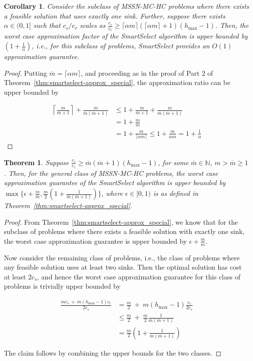\documentclass[conference]{IEEEtran}
\newcommand{\mbar}{\overline{m}}
\newtheorem{theorem}{Theorem}
\newtheorem{corollary}{Corollary}
\begin{document}
\begin{corollary}
Consider the subclass of MSSN-MC-HC problems where there exists a feasible solution that uses exactly one sink. Further, suppose there exists $\alpha\in (0,1]$ such that $c_s/c_r$ scales as $\frac{c_s}{c_r}\geq \lceil\alpha m\rceil (\lceil\alpha m\rceil + 1)(h_{\max}-1)$. Then, the worst case approximation factor of the SmartSelect algorithm is upper bounded by $(1+\frac{1}{\alpha})$, i.e., for this subclass of problems, SmartSelect provides an $O(1)$ approximation guarantee.
\end{corollary}

\begin{proof}
Putting $\mbar = \lceil\alpha m\rceil$, and proceeding as in the proof of Part 2 of Theorem~\ref{thm:smartselect-approx_special}, the approximation ratio can be upper bounded by

\begin{align}
\left\lceil\frac{m}{\mbar + 1}\right\rceil+\frac{m}{\mbar(\mbar + 1)}&\leq 1+\frac{m}{\mbar + 1}+\frac{m}{\mbar(\mbar + 1)}\nonumber\\
&= 1 + \frac{m}{\mbar}\nonumber\\
&= 1+ \frac{m}{\lceil\alpha m\rceil}\leq 1+\frac{m}{\alpha m}=1+\frac{1}{\alpha}\nonumber
\end{align}
\end{proof}

\begin{theorem}
\label{thm:smartselect-approx_general}
Suppose $\frac{c_s}{c_r}\geq \mbar(\mbar+1)(h_{\max}-1)$, for some $\mbar\in\mathbb{N}$, $m > \mbar \geq 1$. Then, for the general class of MSSN-MC-HC problems, the worst case approximation guarantee of the SmartSelect algorithm is upper bounded by $\max\{\epsilon + \frac{m}{\mbar},\frac{m}{2}\left(1+\frac{1}{\mbar(\mbar + 1)}\right)\}$, where $\epsilon\in[0,1)$ is as defined in Theorem~\ref{thm:smartselect-approx_special}.
\end{theorem}

\begin{proof}
From Theorem~\ref{thm:smartselect-approx_special}, we know that for the subclass of problems where there exists a feasible solution with exactly one sink, the worst case approximation guarantee is upper bounded by $\epsilon + \frac{m}{\mbar}$.

Now consider the remaining class of problems, i.e., the class of problems where any feasible solution uses at least two sinks. Then the optimal solution has cost at least $2c_s$, and hence the worst case approximation guarantee for this class of problems is trivially upper bounded by

\begin{align}
\frac{mc_s\:+\:m(h_{\max}-1)c_r}{2c_s}&= \frac{m}{2}\:+\:m(h_{\max}-1)\frac{c_r}{2c_s}\nonumber\\
&\leq \frac{m}{2}\:+\:\frac{m}{2}\frac{1}{\mbar(\mbar + 1)}\nonumber\\
&= \frac{m}{2}\left(1+\frac{1}{\mbar(\mbar + 1)}\right)\nonumber
\end{align}

The claim follows by combining the upper bounds for the two classes. 
\end{proof}
\end{document}
